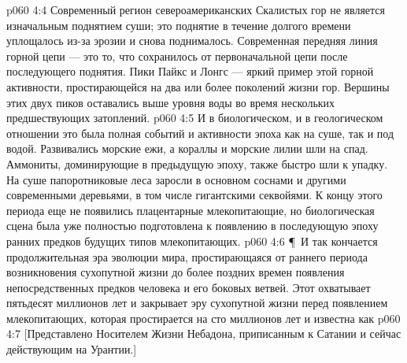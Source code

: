 \vs p060 4:4 Современный регион североамериканских Скалистых гор не является изначальным поднятием суши; это поднятие в течение долгого времени уплощалось из\hyp{}за эрозии и снова поднималось. Современная передняя линия горной цепи --- это то, что сохранилось от первоначальной цепи после последующего поднятия. Пики Пайкс и Лонгс --- яркий пример этой горной активности, простирающейся на два или более поколений жизни гор. Вершины этих двух пиков оставались выше уровня воды во время нескольких предшествующих затоплений.
\vs p060 4:5 И в биологическом, и в геологическом отношении это была полная событий и активности эпоха как на суше, так и под водой. Развивались морские ежи, а кораллы и морские лилии шли на спад. Аммониты, доминирующие в предыдущую эпоху, также быстро шли к упадку. На суше папоротниковые леса заросли в основном соснами и другими современными деревьями, в том числе гигантскими секвойями. К концу этого периода еще не появились плацентарные млекопитающие, но биологическая сцена была уже полностью подготовлена к появлению в последующую эпоху ранних предков будущих типов млекопитающих.
\vs p060 4:6 \P\ И так кончается продолжительная эра эволюции мира, простирающаяся от раннего периода возникновения сухопутной жизни до более поздних времен появления непосредственных предков человека и его боковых ветвей. Этот  охватывает пятьдесят миллионов лет и закрывает эру сухопутной жизни перед появлением млекопитающих, которая простирается на сто миллионов лет и известна как 
\vs p060 4:7 [Представлено Носителем Жизни Небадона, приписанным к Сатании и сейчас действующим на Урантии.]
